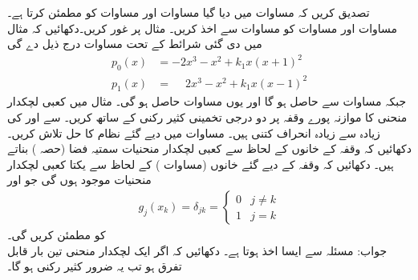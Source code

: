 
\quad
تصدیق کریں کہ مساوات  میں دیا گیا  مساوات  اور مساوات  کو مطمئن کرتا ہے۔
\quad
مساوات  اور مساوات  کو مساوات  سے اخذ کریں۔
\quad
مثال  پر غور کریں۔دکھائیں کہ مثال میں دی گئی شرائط کے تحت مساوات  درج ذیل دے گی
\begin{align*}
p_0(x)&=-2x^3-x^2+k_1x(x+1)^2\\
p_1(x)&=\phantom{-}2x^3-x^2+k_1x(x-1)^2
\end{align*}
جبکہ مساوات  سے  حاصل ہو گا اور یوں مساوات  حاصل ہو گی۔
\quad
مثال  میں کعبی لچکدار منحنی کا موازنہ پورے وقفہ پر دو درجی تخمینی کثیر رکنی  کے ساتھ کریں۔  سے  اور  کی زیادہ سے زیادہ انحراف کتنی ہیں۔
\quad
مساوات  میں دیے گئے نظام کا حل تلاش کریں۔
\quad
دکھائیں کہ وقفہ کے خانوں کے لحاظ سے کعبی لچکدار منحنیات سمتیہ فضا (حصہ ) بناتے ہیں۔
\quad
دکھائیں کہ وقفہ کے  دیے گئے خانوں  (مساوات ) کے لحاظ سے   یکتا کعبی لچکدار منحنیات  موجود ہوں گی جو  اور
\begin{align*}
g_j(x_k)=\delta_{jk}=
\begin{cases}
0& j\ne k\\
1&j=k
\end{cases}
\end{align*}
کو مطمئن کریں گی۔\\
جواب:\quad 
مسئلہ  سے ایسا اخذ ہوتا ہے۔
\quad
دکھائیں کہ اگر ایک لچکدار منحنی تین بار قابل تفرق ہو تب یہ ضرور کثیر رکنی ہو گا۔
\quad

